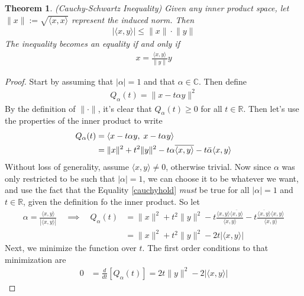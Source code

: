 \documentclass[12pt]{article}
\numberwithin{equation}{section} %
\theoremstyle{plain}
\newtheorem{thm}{Theorem}[section]
\theoremstyle{definition}
\theoremstyle{remark}
\begin{document}
\begin{thm}
\label{thm.cauchyscwarz}
\emph{(Cauchy-Schwartz Inequality)}
Given any inner product space, let
$\lVert x\rVert := \sqrt{\langle x,x\rangle}$ represent the induced
norm.  Then
\begin{align*}
  \lvert \langle x,y\rangle\rvert \leq \lVert x\rVert\cdot\lVert y\rVert
\end{align*}
The inequality becomes an equality if and only if
\begin{align*}
  x = \frac{\langle x,y\rangle}{\lVert y\rVert}y
\end{align*}
\end{thm}
\begin{proof}
Start by assuming that $|\alpha|=1$ and that $\alpha\in\mathbb{C}$. Then
define
\begin{align*}
  Q_\alpha(t) = \lVert x - t\alpha y\rVert^2
\end{align*}
By the definition of $\lVert \cdot\rVert$, it's clear that
$Q_\alpha(t)\geq 0$ for all $t\in\mathbb{R}$. Then let's use the
properties of the inner product to write
\begin{align}
    Q_\alpha(t) &= \langle x -t\alpha y,\; x -t\alpha y\rangle \notag \\
    &= \lVert x\rVert^2 + t^2 \lVert y\rVert^2
    - t\alpha \overline{\langle x,y\rangle}
    - t\bar{\alpha} {\langle x,y\rangle} \label{cauchyhold}
\end{align}
Without loss of generality, assume $\langle x,y\rangle\neq 0$, otherwise
trivial. Now since $\alpha$ was only restricted to be such that
$|\alpha|=1$, we can choose it to be whatever we want, and use the fact
that the Equality \ref{cauchyhold} \emph{must} be true for all
$|\alpha|=1$ and $t\in\mathbb{R}$, given the definition fo the inner
product. So let
\begin{align*}
    \alpha = \frac{\langle x,y\rangle}{|\langle x,y\rangle|}
    \quad\implies\quad
    Q_\alpha(t) &= \lVert x\rVert^2 + t^2 \lVert y\rVert^2
    - t\frac{\langle x,y\rangle\overline{\langle x,y\rangle}}{\langle x,y\rangle}
    - t\frac{\overline{\langle x,y\rangle}{\langle x,y\rangle}}{\langle x,y\rangle}  \\
    &= \lVert x\rVert^2 + t^2 \lVert y\rVert^2
    -2t |\langle x,y\rangle|
\end{align*}
Next, we minimize the function over $t$. The first order conditions to
that minimization are
\begin{align*}
  0 &= \frac{d}{dt}[Q_\alpha(t)]
    = 2t \lVert y\rVert^2 -2 |\langle x,y\rangle|

\end{align*}
\end{proof}
\end{document}
